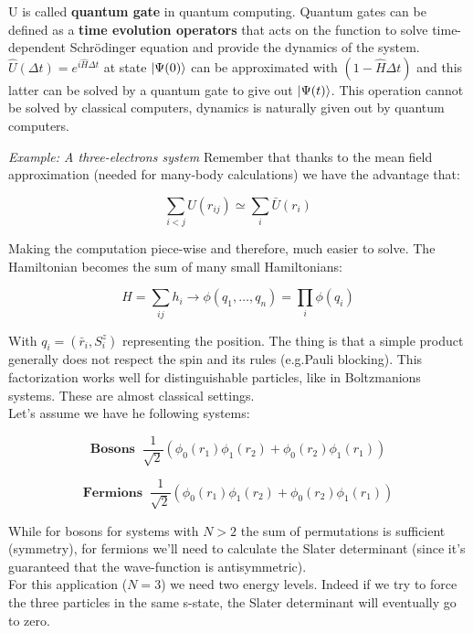 	U is called \textbf{quantum gate} in quantum computing.
	Quantum gates can be defined as a \textbf{time evolution operators} that acts on the function to solve time-dependent Schr\"odinger equation and provide the dynamics of the system.
	$\hat{U}(\Delta t) = e^{i\hat{H}\Delta t}$ at state $\ket{\Psi(0)}$ can be approximated with $(1-\hat{H}\Delta t)$ and this latter can be solved by a quantum gate to give out $\ket{\Psi(t)}$.
This operation cannot be solved by classical computers, dynamics is naturally given out by quantum computers.

	\textit{Example: A three-electrons system}
	Remember that thanks to the mean field approximation (needed for many-body calculations) we have the advantage that:

	$$\sum_{i<j} U(r_{ij}) \simeq \sum_i \bar{U}(r_i)$$

	Making the computation piece-wise and therefore, much easier to solve.
	The Hamiltonian becomes the sum of many small Hamiltonians:

	$$H = \sum_{ij} h_i \rightarrow \phi(q_1, \dots, q_n) = \prod_i \phi(q_i)$$

	With $q_i = (\bar{r}_i, S^z_i)$ representing the position.
The thing is that a simple product generally does not respect the spin and its rules (e.g.Pauli blocking).
This factorization works well for distinguishable particles, like in Boltzmanions systems.
These are almost classical settings.
\\
	Let's assume we have he following systems:

	$$\textbf{Bosons} \;\; \frac{1}{\sqrt{2}}(\phi_0(r_1)\phi_1(r_2) + \phi_0(r_2)\phi_1(r_1))$$

	$$\textbf{Fermions} \;\; \frac{1}{\sqrt{2}}(\phi_0(r_1)\phi_1(r_2) + \phi_0(r_2)\phi_1(r_1))$$

	While for bosons for systems with $N>2$ the sum of permutations is sufficient (symmetry), for fermions we'll need to calculate the Slater determinant (since it's guaranteed that the wave-function is antisymmetric).
\\
	For this application ($N = 3 $) we need two energy levels.
Indeed if we try to force the three particles in the same s-state, the Slater determinant will eventually go to zero.

